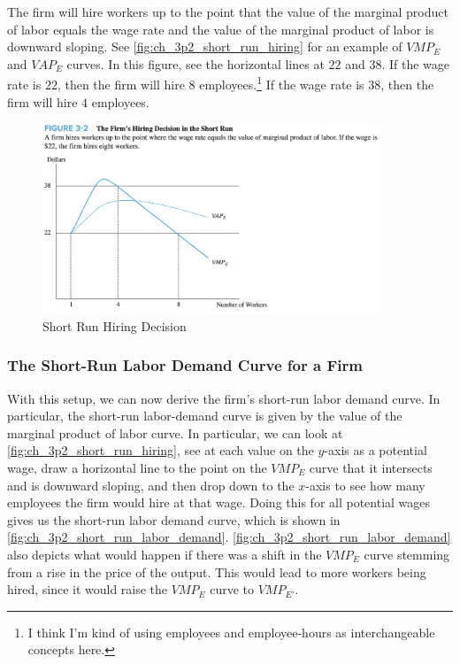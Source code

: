 The firm will hire workers up to the point that 
the value of the marginal product of labor 
equals the wage rate and the value of the marginal product 
of labor is downward sloping. See 
\autoref{fig:ch_3p2_short_run_hiring}
for an example of $VMP_E$ and $VAP_E$ curves.
In this figure, see the horizontal lines at 
$22$ and $38$. If the wage rate is $22$,
then the firm will hire $8$ employees.\footnote{I think I'm kind 
of using employees and employee-hours as interchangeable concepts
here.}
If the wage rate is $38$, then the firm will
hire $4$ employees.


\FloatBarrier

\begin{figure}[!htb]
    \centering
        \includegraphics[width=0.9\textwidth]{../input/ch_3p2_short_run_hiring.png}
    \caption{Short Run Hiring Decision}
    \label{fig:ch_3p2_short_run_hiring}
\end{figure}

\FloatBarrier

\subsubsection{The Short-Run Labor Demand Curve for a Firm}

With this setup, we can now derive the 
firm's short-run labor demand curve. 
In particular, 
the short-run labor-demand curve is given by
the value of the marginal product of labor curve.
In particular, we can look at \autoref{fig:ch_3p2_short_run_hiring},
see at each value on the $y$-axis as a potential wage, 
draw a horizontal line to the
point on the $VMP_E$ curve that it intersects and is downward sloping,
and then drop down to the $x$-axis to see how many employees
the firm would hire at that wage.
Doing this for all potential wages gives us the
short-run labor demand curve, which is shown in
\autoref{fig:ch_3p2_short_run_labor_demand}.
\autoref{fig:ch_3p2_short_run_labor_demand}
also depicts what would happen if there was a shift 
in the $VMP_E$ curve stemming from a 
rise in the price of the output. This would 
lead to more workers being hired, since it would 
raise the $VMP_E$ curve to $VMP_{E'}$.


